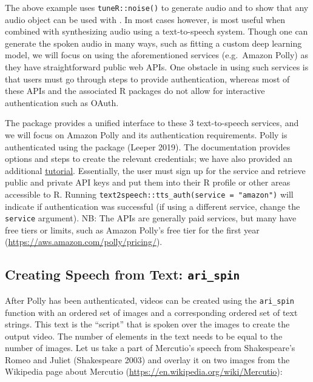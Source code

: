 The above example uses \texttt{tuneR::noise()} to generate audio and to
show that any audio object can be used with . In most cases
however,  is most useful when combined with synthesizing audio
using a text-to-speech system. Though one can generate the spoken audio
in many ways, such as fitting a custom deep learning model, we will
focus on using the aforementioned services (e.g.~Amazon Polly) as they
have straightforward public web APIs. One obstacle in using such
services is that users must go through steps to provide authentication,
whereas most of these APIs and the associated R packages do not allow
for interactive authentication such as OAuth.

The  package provides a unified interface to these 3
text-to-speech services, and we will focus on Amazon Polly and its
authentication requirements. Polly is authenticated using the
 package (Leeper 2019). The 
documentation provides options and steps to create the relevant
credentials; we have also provided an additional
\href{http://seankross.com/2017/05/02/Access-Amazon-Web-Services-in-R.html}{tutorial}.
Essentially, the user must sign up for the service and retrieve public
and private API keys and put them into their R profile or other areas
accessible to R. Running
\texttt{text2speech::tts\_auth(service\ =\ "amazon")} will indicate if
authentication was successful (if using a different service, change the
\texttt{service} argument). NB: The APIs are generally paid services,
but many have free tiers or limits, such as Amazon Polly's free tier for
the first year (\url{https://aws.amazon.com/polly/pricing/}).

\hypertarget{creating-speech-from-text-ari_spin}{%
\subsection{\texorpdfstring{Creating Speech from Text:
\texttt{ari\_spin}}{Creating Speech from Text: ari\_spin}}\label{creating-speech-from-text-ari_spin}}

After Polly has been authenticated, videos can be created using the
\texttt{ari\_spin} function with an ordered set of images and a
corresponding ordered set of text strings. This text is the ``script''
that is spoken over the images to create the output video. The number of
elements in the text needs to be equal to the number of images. Let us
take a part of Mercutio's speech from Shakespeare's Romeo and Juliet
(Shakespeare 2003) and overlay it on two images from the Wikipedia page
about Mercutio (\url{https://en.wikipedia.org/wiki/Mercutio}):

